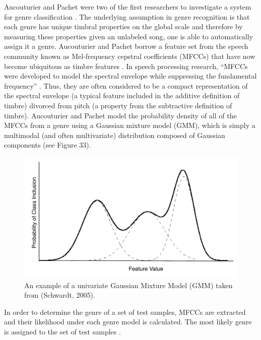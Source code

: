 \documentclass[12pt]{report} 	%
\numberwithin{figure}{chapter}
\numberwithin{table}{chapter}
\numberwithin{equation}{chapter}
\begin{document}
\begin{flushleft}
Aucouturier and Pachet were two of the first researchers to investigate a system for genre classification \cite{Aucouturier:2002gf}. The underlying assumption in genre recognition is that each genre has unique timbral properties on the global scale and therefore by measuring these properties given an unlabeled song, one is able to automatically assign it a genre. Aucouturier and Pachet borrow a feature set from the speech community known as Mel-frequency cepstral coefficients (MFCCs) that have now become ubiquitous as timbre features \cite[p. 1]{Aucouturier:2002gf}. In speech processing research, ``MFCCs were developed to model the spectral envelope while suppressing the fundamental frequency'' \cite[p. 1]{Jensen:2006dw}. Thus, they are often considered to be a compact representation of the spectral envelope (a typical feature included in the additive definition of timbre) divorced from pitch (a property from the subtractive definition of timbre). Aucouturier and Pachet model the probability density of all of the MFCCs from a genre using a Gaussian mixture model (GMM), which is simply a multimodal (and often multivariate) distribution composed of Gaussian components (see Figure 33). 
\begin{figure}[h!]
\begin{center}
\includegraphics[scale=0.70]{GMM}
\caption[Gaussian mixture models]{An example of a univariate Gaussian Mixture Model (GMM) taken from (Schwardt, 2005).}
\end{center}
\end{figure}
In order to determine the genre of a set of test samples, MFCCs are extracted and their likelihood under each genre model is calculated. The most likely genre is assigned to the set of test samples \cite[p. 2]{Aucouturier:2002gf}.


\end{flushleft}
\end{document}
